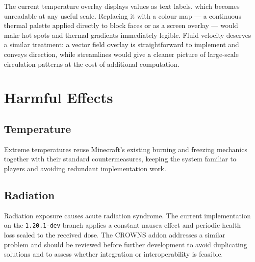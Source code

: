 \documentclass{report}
\begin{document}
The current temperature overlay displays values as text labels, which becomes unreadable
at any useful scale. Replacing it with a colour map — a continuous thermal palette
applied directly to block faces or as a screen overlay — would make hot spots and thermal
gradients immediately legible. Fluid velocity deserves a similar treatment: a vector
field overlay is straightforward to implement and conveys direction, while streamlines
would give a cleaner picture of large-scale circulation patterns at the cost of
additional computation.

\section{Harmful Effects}

\subsection{Temperature}

Extreme temperatures reuse Minecraft's existing burning and freezing mechanics together
with their standard countermeasures, keeping the system familiar to players and avoiding
redundant implementation work.

\subsection{Radiation}

Radiation exposure causes acute radiation syndrome. The current implementation on the
\texttt{1.20.1-dev} branch applies a constant nausea effect and periodic health loss
scaled to the received dose. The CROWNS addon addresses a similar problem and should be
reviewed before further development to avoid duplicating solutions and to assess whether
integration or interoperability is feasible.
\end{document}
